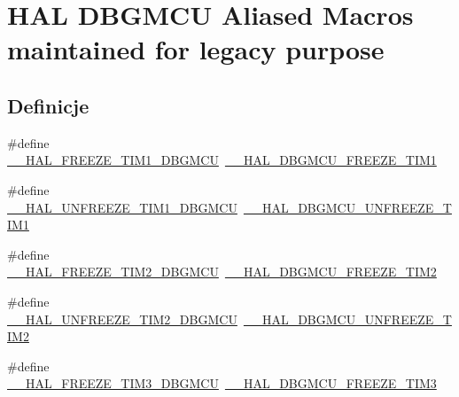 \hypertarget{group___h_a_l___d_b_g_m_c_u___aliased___macros}{}\section{H\+AL D\+B\+G\+M\+CU Aliased Macros maintained for legacy purpose}
\label{group___h_a_l___d_b_g_m_c_u___aliased___macros}
\subsection*{Definicje}
\begin{DoxyCompactItemize}
\item 
\#define \hyperlink{group___h_a_l___d_b_g_m_c_u___aliased___macros_gac0c5e626811757be9054cdeef7df4980}{\+\_\+\+\_\+\+H\+A\+L\+\_\+\+F\+R\+E\+E\+Z\+E\+\_\+\+T\+I\+M1\+\_\+\+D\+B\+G\+M\+CU}~\hyperlink{group___h_a_l___exported___macros_ga93d7e54d78e5dea068f5f6a94d5f94c7}{\+\_\+\+\_\+\+H\+A\+L\+\_\+\+D\+B\+G\+M\+C\+U\+\_\+\+F\+R\+E\+E\+Z\+E\+\_\+\+T\+I\+M1}
\item 
\#define \hyperlink{group___h_a_l___d_b_g_m_c_u___aliased___macros_ga331504a5985db6b71dfbb29a4fc4d670}{\+\_\+\+\_\+\+H\+A\+L\+\_\+\+U\+N\+F\+R\+E\+E\+Z\+E\+\_\+\+T\+I\+M1\+\_\+\+D\+B\+G\+M\+CU}~\hyperlink{group___h_a_l___exported___macros_ga2f91eec9f9a424ab611be0e770c6692e}{\+\_\+\+\_\+\+H\+A\+L\+\_\+\+D\+B\+G\+M\+C\+U\+\_\+\+U\+N\+F\+R\+E\+E\+Z\+E\+\_\+\+T\+I\+M1}
\item 
\#define \hyperlink{group___h_a_l___d_b_g_m_c_u___aliased___macros_ga94f02b5b50bb79574876c05eb507607b}{\+\_\+\+\_\+\+H\+A\+L\+\_\+\+F\+R\+E\+E\+Z\+E\+\_\+\+T\+I\+M2\+\_\+\+D\+B\+G\+M\+CU}~\hyperlink{group___h_a_l___exported___macros_ga4a466905a367266e7c23417248dc741d}{\+\_\+\+\_\+\+H\+A\+L\+\_\+\+D\+B\+G\+M\+C\+U\+\_\+\+F\+R\+E\+E\+Z\+E\+\_\+\+T\+I\+M2}
\item 
\#define \hyperlink{group___h_a_l___d_b_g_m_c_u___aliased___macros_gaf710a524a97565d4a117321ce7a6571c}{\+\_\+\+\_\+\+H\+A\+L\+\_\+\+U\+N\+F\+R\+E\+E\+Z\+E\+\_\+\+T\+I\+M2\+\_\+\+D\+B\+G\+M\+CU}~\hyperlink{group___h_a_l___exported___macros_gafd40134436233985a840e1cd8eb6c4c3}{\+\_\+\+\_\+\+H\+A\+L\+\_\+\+D\+B\+G\+M\+C\+U\+\_\+\+U\+N\+F\+R\+E\+E\+Z\+E\+\_\+\+T\+I\+M2}
\item 
\#define \hyperlink{group___h_a_l___d_b_g_m_c_u___aliased___macros_gab77737aff6c6ee212a5837dd7320c06b}{\+\_\+\+\_\+\+H\+A\+L\+\_\+\+F\+R\+E\+E\+Z\+E\+\_\+\+T\+I\+M3\+\_\+\+D\+B\+G\+M\+CU}~\hyperlink{group___h_a_l___exported___macros_gaf2fe2b6d0a5e8df4ebb38020acf210d9}{\+\_\+\+\_\+\+H\+A\+L\+\_\+\+D\+B\+G\+M\+C\+U\+\_\+\+F\+R\+E\+E\+Z\+E\+\_\+\+T\+I\+M3}

\end{DoxyCompactItemize}
